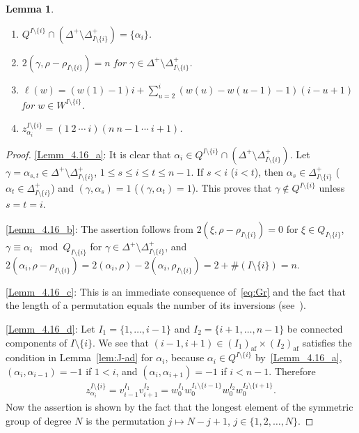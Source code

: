 \documentclass[10pt]{amsart}
\newtheorem{lemm}[theo]{Lemma}
\theoremstyle{definition}\newtheorem{defi}[theo]{Definition}
\theoremstyle{remark}\newtheorem{rema}[theo]{Remark}
\DeclareMathOperator{\af}{af}
\begin{document}
\goodbreak
\begin{lemm} \label{lem:J^i-ad}\ \\[-1.2em]
\begin{enumerate}[label=(\arabic*)]
\item\label{Lemm_4.16_a}
$Q^{I \setminus \{ i \}} \cap (\Delta^+ \setminus \Delta_{I \setminus \{ i \}}^+) = \{ \alpha_i \}$.
\item\label{Lemm_4.16_b}
$2(\gamma,\rho-\rho_{I \setminus \{ i \}}) = n$ 
for 
$\gamma \in \Delta^+ \setminus \Delta_{I \setminus \{ i \}}^+$.
\item\label{Lemm_4.16_c}
$\ell(w) = (w(1) - 1)i + \sum_{u=2}^i (w(u) - w(u-1) -1)(i - u + 1)$ 
for $w \in W^{I \setminus \{ i \}}$.
\item\label{Lemm_4.16_d}
$z_{\alpha_i}^{I \setminus \{ i \}} = (1 \ 2 \ \cdots \ i)(n \ n-1 \ \cdots \ i+1)$.
\end{enumerate}
\end{lemm}

\begin{proof}
\ref{Lemm_4.16_a}: 
It is clear that 
$\alpha_i \in Q^{I \setminus \{ i \}} \cap (\Delta^+ \setminus \Delta_{I \setminus \{ i \}}^+)$. 
Let 
$\gamma = \alpha_{s,t} \in \Delta^+ \setminus \Delta_{I \setminus \{ i \}}^+$, 
$1 \leq s \leq i \leq t \leq n-1$. 
If $s < i$ (\resp $i < t$), then 
$\alpha_s \in \Delta_{I \setminus \{ i \}}^+$
(\resp $\alpha_t \in \Delta_{I \setminus \{ i \}}^+$) 
and 
$(\gamma , \alpha_s) = 1$
(\resp $(\gamma , \alpha_t) = 1$). 
This proves that 
$\gamma \notin Q^{I \setminus \{ i \}}$ 
unless 
$s = t = i$.

\ref{Lemm_4.16_b}: 
The assertion follows from 
$2(\xi , \rho-\rho_{I \setminus \{ i \}}) = 0$
for 
$\xi \in Q_{I \setminus \{ i \}}$, 
$\gamma \equiv \alpha_i \mod Q_{I \setminus \{ i \}}$
for 
$\gamma \in \Delta^+ \setminus \Delta_{I \setminus \{ i \}}^+$, 
and 
$2(\alpha_i , \rho-\rho_{I \setminus \{ i \}}) = 2(\alpha_i , \rho) - 2(\alpha_i , \rho_{I \setminus \{ i \}}) = 2+ \# (I \setminus \{ i \}) = n$.

\ref{Lemm_4.16_c}: 
This is an immediate consequence of~\eqref{eq:Gr} 
and the fact that the length of 
a permutation equals the number of its inversions
(see~\cite[Proposition~1.5.2]{BB}).

\ref{Lemm_4.16_d}: 
Let 
$I_1 = \{ 1 , \ldots , i-1 \}$
and
$I_2 = \{ i+1 , \ldots , n-1 \}$
be connected components of $I \setminus \{ i \}$. 
We see that
$(i-1,i+1) \in (I_1)_{\af} \times (I_2)_{\af}$ 
satisfies the condition in Lemma~\ref{lem:J-ad} for $\alpha_i$, 
because $\alpha_i \in Q^{I \setminus \{ i \}}$ by~\ref{Lemm_4.16_a}, 
$(\alpha_i , \alpha_{i-1}) = -1$ if $1<i$, 
and 
$(\alpha_i , \alpha_{i+1}) = -1$ if $i<n-1$. 
Therefore 
\begin{align}
z_{\alpha_i}^{I \setminus \{ i \}} 
= 
v_{i-1}^{I_1} v_{i+1}^{I_2}
=
w_0^{I_1} w_0^{I_1 \setminus \{ i-1 \}}
w_0^{I_2} w_0^{I_2 \setminus \{ i+1 \}}.
\end{align}
Now the assertion is shown by the fact that 
the longest element of the symmetric group of degree $N$ 
is the permutation 
$j \mapsto N-j+1$, 
$j \in \{ 1,2,\ldots ,N \}$.
\end{proof}
\end{document}
